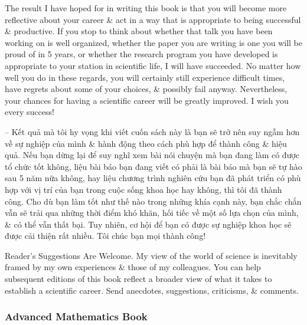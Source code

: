 \documentclass{article}
\begin{document}
\begin{enumerate}
\begin{itemize}
		The result I have hoped for in writing this book is that you will become more reflective about your career \& act in a way that is appropriate to being successful \& productive. If you stop to think about whether that talk you have been working on is well organized, whether the paper you are writing is one you will be proud of in 5 years, or whether the research program you have developed is appropriate to your station in scientific life, I will have succeeded. No matter how well you do in these regards, you will certainly still experience difficult times, have regrets about some of your choices, \& possibly fail anyway. Nevertheless, your chances for having a scientific career will be greatly improved. I wish you every success!
		
		-- Kết quả mà tôi hy vọng khi viết cuốn sách này là bạn sẽ trở nên suy ngẫm hơn về sự nghiệp của mình \& hành động theo cách phù hợp để thành công \& hiệu quả. Nếu bạn dừng lại để suy nghĩ xem bài nói chuyện mà bạn đang làm có được tổ chức tốt không, liệu bài báo bạn đang viết có phải là bài báo mà bạn sẽ tự hào sau 5 năm nữa không, hay liệu chương trình nghiên cứu bạn đã phát triển có phù hợp với vị trí của bạn trong cuộc sống khoa học hay không, thì tôi đã thành công. Cho dù bạn làm tốt như thế nào trong những khía cạnh này, bạn chắc chắn vẫn sẽ trải qua những thời điểm khó khăn, hối tiếc về một số lựa chọn của mình, \& có thể vẫn thất bại. Tuy nhiên, cơ hội để bạn có được sự nghiệp khoa học sẽ được cải thiện rất nhiều. Tôi chúc bạn mọi thành công!
	\end{itemize}
	{\sf Reader's Suggestions Are Welcome.} My view of the world of science is inevitably framed by my own experiences \& those of my colleagues. You can help subsequent editions of this book reflect a broader view of what it takes to establish a scientific career. Send anecdotes, suggestions, criticisms, \& comments.
\end{enumerate}

\subsubsection{Advanced Mathematics Book}
\end{document}
